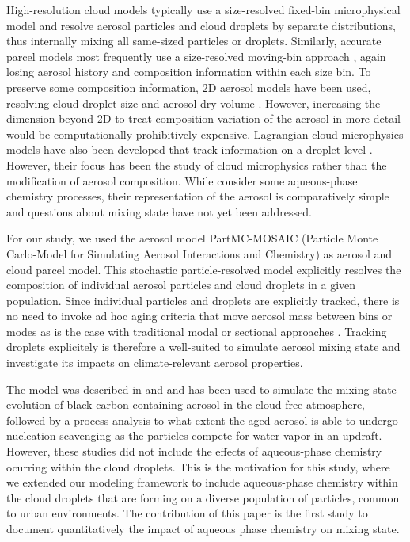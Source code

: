 \documentclass[edeposit,fullpage]{uiucthesis2009}
\begin{document}
High-resolution cloud models typically use a size-resolved fixed-bin
microphysical model \citep{Flossmann1994,Feingold1996} and resolve
aerosol particles and cloud droplets by separate distributions, thus
internally mixing all same-sized particles or droplets. Similarly,
accurate parcel models most frequently use a size-resolved moving-bin
approach \citep{Kreidenweis2003,Cooper1997}, again losing aerosol
history and composition information within each size bin. To preserve
some composition information, 2D aerosol models have been used,
resolving cloud droplet size and aerosol dry volume
\citep{Bott1996,Ovchinnikov2010}. However, increasing the dimension
beyond 2D to treat composition variation of the aerosol in more detail
would be computationally prohibitively expensive. Lagrangian cloud
microphysics models have also been developed that track
information on a droplet level \citep{Shima2009,
  Andrejczuk2008,Grabowski2019,Soelch2010,
  Unterstrasser2014,Jaruga2018}. However, their focus has been the
study of cloud microphysics rather than the modification of aerosol
composition. While \citet{Jaruga2018} consider some aqueous-phase
chemistry processes, their representation of the aerosol is
comparatively simple and questions about mixing state have not yet
been addressed.

For our study, we used the aerosol model PartMC-MOSAIC (Particle Monte
Carlo-Model for Simulating Aerosol Interactions and Chemistry)
\citep{Riemer2009,Zaveri2008} as aerosol and cloud parcel model. This
stochastic particle-resolved model explicitly resolves the composition
of individual aerosol particles and cloud droplets in a given
population. Since individual particles and droplets are explicitly
tracked, there is no need to invoke ad hoc aging criteria that move
aerosol mass between bins or modes as is the case with traditional
modal or sectional approaches \citep{Riemer2003,Stier2005,
  Bauer2008,Jacobson2001}. Tracking droplets explicitely is therefore
a well-suited to simulate aerosol mixing state and investigate its
impacts on climate-relevant aerosol properties.

The model was described in \citet{ching2012impacts} and \citet{Ching2016} and
has been used to simulate the mixing state evolution of
black-carbon-containing aerosol in the cloud-free atmosphere, followed
by a process analysis to what extent the aged aerosol is able to
undergo nucleation-scavenging as the particles compete for water vapor
in an updraft. However, these studies did not include the effects of
aqueous-phase chemistry ocurring within the cloud droplets. This is
the motivation for this study, where we extended our modeling framework
to include aqueous-phase chemistry within the cloud droplets that are
forming on a diverse population of particles, common to urban
environments. The contribution of this paper is the first study to
document quantitatively the impact of aqueous phase
chemistry on mixing state.
\end{document}
